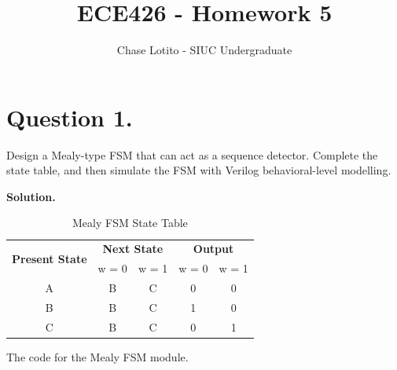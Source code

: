 \documentclass{article}
\title{ECE426 - Homework 5}
\author{Chase Lotito - SIUC Undergraduate}
\date{}
\begin{document}
\pagestyle{fancy}

\maketitle

\fancyhead{}


\section{Question 1.}

Design a Mealy-type FSM that can act as a sequence detector. Complete the state table, and then simulate the FSM with Verilog behavioral-level modelling.

\bigskip

\textbf{Solution.}

\begin{table}[!h]
  \centering
  \begin{tabular}{|c|c|c|c|c|}
    \hline
    \multirow{2}{*}{\textbf{Present State}} & \multicolumn{2}{|c|}{\textbf{Next State}} & \multicolumn{2}{|c|}{\textbf{Output}} \\
    \cline{2-5}
    & w = 0 & w = 1 & w = 0 & w = 1  \\
    \hline
    A & B & C & 0 & 0 \\
    \hline
    B & B & C & 1 & 0 \\
    \hline
    C & B & C & 0 & 1 \\
    \hline
  \end{tabular}
  \caption{Mealy FSM State Table}
  \label{tab:q1-state-table}
\end{table}

The code for the Mealy FSM module.
\end{document}
